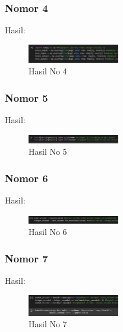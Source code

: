 \subsubsection{Nomor 4}
\hfill\break

Hasil:
\begin{figure}[H]
\centering
	\includegraphics[width=4cm]{figures/1174067/7/no4.jpg}
	\caption{Hasil No 4}
\end{figure}

\subsubsection{Nomor 5}
\hfill\break

Hasil:
\begin{figure}[H]
\centering
	\includegraphics[width=4cm]{figures/1174067/7/no5.jpg}
	\caption{Hasil No 5}
\end{figure}

\subsubsection{Nomor 6}
\hfill\break

Hasil:
\begin{figure}[H]
\centering
	\includegraphics[width=4cm]{figures/1174067/7/no6.jpg}
	\caption{Hasil No 6}
\end{figure}

\subsubsection{Nomor 7}
\hfill\break

Hasil:
\begin{figure}[H]
\centering
	\includegraphics[width=4cm]{figures/1174067/7/no7.jpg}
	\caption{Hasil No 7}
\end{figure}

